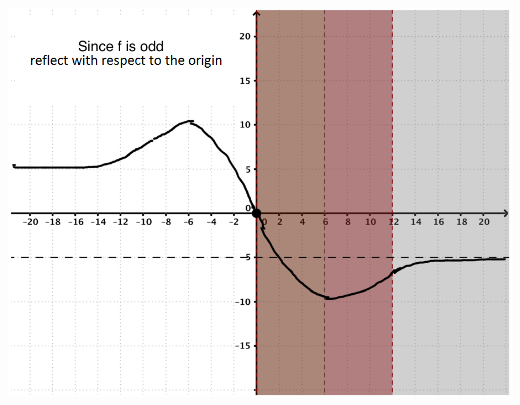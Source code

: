 \documentclass[nooutcomes]{ximera}
\begin{document}
\begin{problem}
\begin{freeResponse}
    \begin{image}
      \includegraphics[scale = 0.35]{Graphfunction7.png}
    \end{image}
  \end{freeResponse}
\end{problem}
\end{document}
